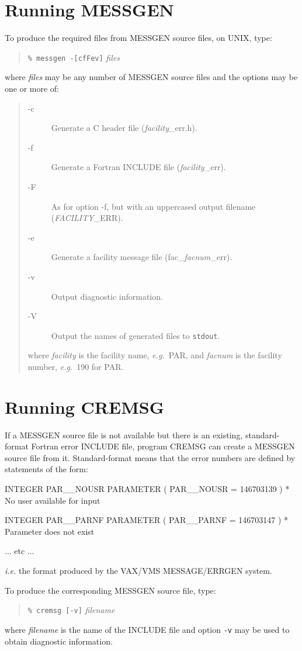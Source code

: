 \documentclass[11pt,nolof]{starlink}
\begin{document}
\section{Running MESSGEN}
To produce the required files from MESSGEN source files, on UNIX, type:
\begin{quote}
\verb!% messgen -[cfFev]! \emph{files}
\end{quote}
where \emph{files} may be any number of MESSGEN source files and the options
 may be one or more of:
\begin{quote}
\begin{description}
\item[-c] Generate a C header file (\emph{facility}\_err.h).
\item[-f] Generate a Fortran INCLUDE file (\emph{facility}\_err).
\item[-F] As for option -f, but with an uppercased output filename
          (\emph{FACILITY}\_ERR).
\item[-e] Generate a facility message file (fac\_\emph{facnum}\_err).
\item[-v] Output diagnostic information.
\item[-V] Output the names of generated files to \texttt{stdout}.
\end{description}
where \emph{facility} is the facility name, \emph{e.g.}\ PAR, and \emph{facnum} is
the facility number, \emph{e.g.}\ 190 for PAR.
\end{quote}

\section{Running CREMSG}
If a MESSGEN source file is not available but there is an existing,
standard-format Fortran error INCLUDE file, program CREMSG can create a MESSGEN
source file from it. Standard-format means that the error numbers are defined
by statements of the form:
\begin{terminalv}
      INTEGER PAR__NOUSR
      PARAMETER ( PAR__NOUSR = 146703139 )
*   No user available for input

      INTEGER PAR__PARNF
      PARAMETER ( PAR__PARNF = 146703147 )
*   Parameter does not exist

    ... etc ...
\end{terminalv}
\emph{i.e.} the format produced by the VAX/VMS MESSAGE/ERRGEN system.

To produce the corresponding MESSGEN source file, type:
\begin{quote}
\verb!% cremsg [-v]! \emph{filename}
\end{quote}
where \emph{filename} is the name of the INCLUDE file and option \verb!-v! may
be used to obtain diagnostic information.
\end{document}
